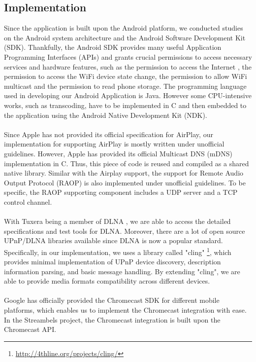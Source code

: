 \subsection{Implementation}
Since the application is built upon the Android platform, we conducted studies on the Android system architecture and the Android Software Development Kit (SDK). Thankfully, the Android SDK provides many useful Application Programming Interfaces (APIs) and grants crucial permissions to access necessary services and hardware features, such as the permission to access the Internet , the permission to access the WiFi device state change, the permission to allow WiFi multicast and  the permission to read phone storage. The programming language used in developing our Android Application is Java. However some CPU-intensive works, such as transcoding, have to be implemented in C and then embedded to the application using the Android Native Development Kit (NDK).\\
\\
Since Apple has not provided its official specification for AirPlay, our implementation for supporting AirPlay is mostly written under unofficial guidelines. However, Apple has provided its official Multicast DNS (mDNS) implementation in C. Thus, this piece of code is reused and compiled as a shared native library. Similar with the Airplay support, the support for Remote Audio Output Protocol (RAOP) is
 also implemented under unofficial guidelines. To be specific, the RAOP supporting component includes a UDP server and a TCP control channel.\\
\\
With Tuxera being a member of DLNA , we are able to access the detailed specifications and test tools for DLNA. Moreover,  there are a lot of open source UPnP/DLNA
 libraries available since DLNA is now a popular standard. Specifically, in our
 implementation, we uses a library called "cling"\cite{cling}
 \footnote{\url{http://4thline.org/projects/cling/}}, which provides minimal implementation of UPnP device discovery, description information parsing, and basic message handling. By extending "cling"\cite{cling}, we are able to provide media formats compatibility across different devices.\\
\\
Google has officially provided the Chromecast SDK for different mobile platforms, which enables us to  implement the Chromecast integration with ease. In the Streambels project, the Chromecast integration is built upon the Chromecast API.\\
